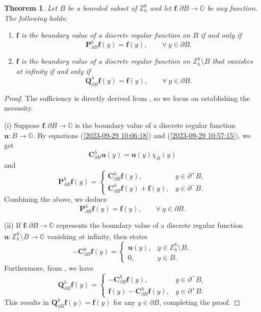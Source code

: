 \documentclass{amsart}
\newtheorem{theorem}{Theorem}[section]
\theoremstyle{definition}
\theoremstyle{remark}
\numberwithin{equation}{section}
\newcommand{\p}{\partial}
\newcommand{\OO}{\mathbb O}
\newcommand{\Z}{\mathbb Z}
\newcommand{\f}{\bm{f}}
\begin{document}
\begin{theorem}\label{2023-09-29 18:34:59}
	Let $B$ be a bounded subset of $\Z^8_h$ and let $\f: \partial B \to\mathbb O$ be any  function. The following holds:
	
	\begin{enumerate}
		\item $\f$ is the boundary value of a discrete regular function on $B$ if and only if
		\[
		\bm P^h_{\p B}\f(y) = \f(y), \qquad \forall\ y \in \p B.
		\]
		
		\item $\f$ is the boundary value of a discrete regular function on $\Z^8_h\setminus B$ that vanishes at infinity if and only if
		\[
		\bm Q^h_{\p B}\f(y) = \f(y), \qquad \forall\  y \in \p B.
		\]
	\end{enumerate}
\end{theorem}

\begin{proof}
	The sufficiency is directly derived from , so we focus on establishing the necessity.
	
(i)	Suppose $\f : \p B \to \OO$ is the boundary value of a discrete regular function $\bm u : B \to \OO$. By equations (\ref{2023-09-29 10:06:18}) and (\ref{2023-09-29 10:57:15}), we get
	\[
	\bm C^h_{\p B} \bm u(y) = \bm u(y) \chi_B(y)
	\]
	and
	\[
	\bm P^h_{\p B} \f(y) =
	\begin{cases}
		\bm C^h_{\p B} \f(y), & y \in \p^+ B, \\
		\bm C^h_{\p B} \f(y) + \f(y), & y \in \p^- B.
	\end{cases}
	\]
	Combining the above, we deduce
	\[
	\bm P^h_{\p B} \f(y) = \f(y), \qquad \forall\  y \in \p B.
	\]
	
(ii) 	If $\f : \p B \to \OO$ represents the boundary value of a discrete regular function
{ $\bm u : \overline{\Z^8_h \setminus B} \to \OO$} vanishing at infinity, then  states
	\[
	-\bm C^h_{\p B} \f(y) =
	\begin{cases}
		\bm u(y), & y \in \Z^8_h\setminus B, \\
		0, & y \in B.
	\end{cases}
	\]
	Furthermore, from , we have
	\[
	\bm Q^h_{\p B}\f(y) =
	\begin{cases}
		-\bm C^h_{\p B} \f(y), & y \in \p^- B, \\
		\f(y) - \bm C^h_{\p B} \f(y), & y \in \p^+ B.
	\end{cases}
	\]
	This results in $\bm Q^h_{\p B}\f(y) = \f(y)$ for any $y \in \p B$, completing the proof.
\end{proof}
\end{document}
